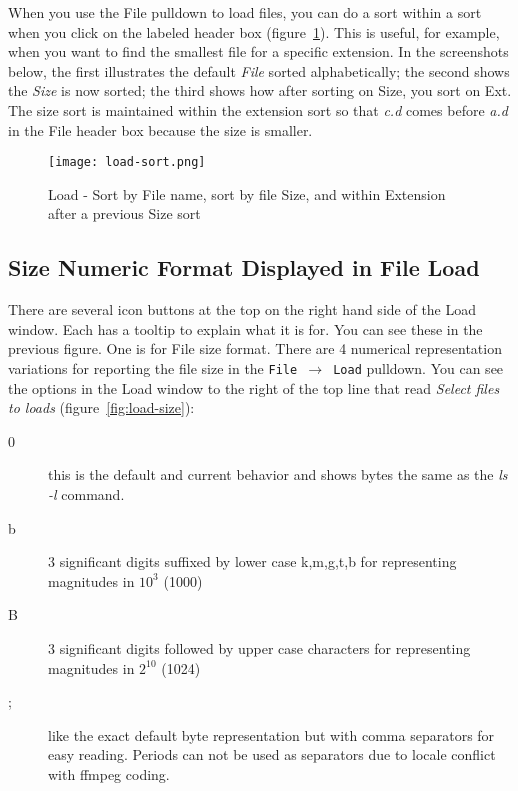 When you use the File pulldown to load files, you can do a sort within a sort when you click on the labeled header box (figure~\ref{fig:load-sort}).  This is useful, for example, when you want to find the smallest file for a specific extension.   In the screenshots below, the first illustrates the default \textit{File} sorted alphabetically; the second shows the \textit{Size} is now sorted; the third shows how after sorting on Size, you sort on Ext.  The size sort is maintained within the extension sort so that \textit{c.d} comes before \textit{a.d} in the File header box because the size is smaller.

\begin{figure}[htpb]
    \centering
    \texttt{[image: load-sort.png]}
    \caption{Load - Sort by File name, sort by file Size, and within Extension after a previous Size sort}
    \label{fig:load-sort}
\end{figure}

\subsection{Size Numeric Format Displayed in File Load}%
\label{sub:size_numeric_format_displayed_file_load}

There are several icon buttons at the top on the right hand side of the Load window.  Each has a tooltip to explain what it is for.  You can see these in the previous figure.  One is for File size format.  There are 4 numerical representation variations for reporting the file size in the \texttt{File $\rightarrow$ Load} pulldown.    You can see the options in the Load window to the right of the top line that read \textit{Select files to loads} (figure~\ref{fig:load-size}):

\begin{description}
    \item[0] this is the default and current behavior and shows bytes the same as the \textit{ls -l} command.
    \item[b] 3 significant digits suffixed by lower case k,m,g,t,b for representing magnitudes in $10^3$ (1000)
    \item[B] 3 significant digits followed by upper case characters for representing magnitudes in $2^{10}$ (1024)
    \item[;] like the exact default byte representation but with comma separators for easy reading.  Periods can
    not be used as separators due to locale conflict with ffmpeg coding.
\end{description}

